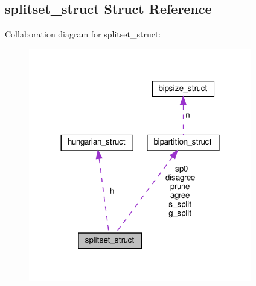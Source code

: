 \hypertarget{structsplitset__struct}{}\subsection{splitset\+\_\+struct Struct Reference}
\label{structsplitset__struct}


Collaboration diagram for splitset\+\_\+struct\+:\nopagebreak
\begin{figure}[H]
\begin{center}
\leavevmode
\includegraphics[width=276pt]{structsplitset__struct__coll__graph}
\end{center}
\end{figure}
